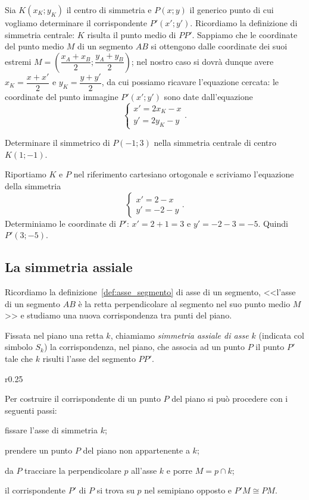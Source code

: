 Sia $K(x_K;y_K)$ il centro di simmetria e $P(x;y)$ il generico punto 
di cui vogliamo determinare il corrispondente $P'(x';y')$. Ricordiamo 
la definizione di simmetria centrale: $K$ risulta il punto medio di 
$PP'$. Sappiamo che le coordinate del punto medio $M$ di un segmento 
$AB$ si ottengono dalle coordinate dei suoi estremi 
$M=\left(\dfrac{x_A+x_B}{2};\dfrac{y_A+y_B}{2}\right)$; nel nostro 
caso si dovrà dunque avere $x_K=\dfrac{x+x'}{2}$ e 
$y_K=\dfrac{y+y'}{2}$, da cui possiamo ricavare l'equazione cercata: 
le coordinate del punto immagine $P'(x';y')$ sono date dall'equazione
\[\begin{cases}x'=2x_K-x\\y'=2y_K-y\end{cases}.\]
\pagebreak
\begin{exrig}
\begin{esempio}
Determinare il simmetrico di $P(-1;3)$ nella simmetria centrale di 
centro $K(1;-1)$.\vspace{7pt}

Riportiamo $K$ e $P$ nel riferimento cartesiano ortogonale e 
scriviamo l'equazione della simmetria
\[\begin{cases}x'=2-x\\y'=-2-y\end{cases}.\]
Determiniamo le coordinate di $P'$: $x'=2+1=3$ e $y'=-2-3=-5$. Quindi 
$P'(3;-5)$.
\end{esempio}
\end{exrig}

\subsection{La simmetria assiale}

Ricordiamo la definizione~\ref{def:asse_segmento} di asse di un 
segmento, <<l'asse di un segmento $AB$ è la retta perpendicolare al 
segmento nel suo punto medio $M$>> e studiamo una nuova 
corrispondenza tra punti del piano.

\begin{definizione}
Fissata nel piano una retta $k$, chiamiamo \emph{simmetria assiale di 
asse $k$} (indicata col simbolo $S_k$) la corrispondenza, nel piano, 
che associa ad un punto $P$ il punto $P'$ tale che $k$ risulti l'asse 
del segmento $PP'$.
\end{definizione}

\setlength{\intextsep}{3pt plus 2.0pt minus 2.0pt}
\begin{wrapfigure}{r}{0.25\textwidth}
	\centering
\end{wrapfigure}
Per costruire il corrispondente di un punto $P$ del piano si può 
procedere con i seguenti passi:
\begin{enumerate*}
\item fissare l'asse di simmetria $k$;
\item prendere un punto $P$ del piano non appartenente a $k$;
\item da $P$ tracciare la perpendicolare $p$ all'asse $k$ e porre 
$M=p\cap k$;
\item il corrispondente $P'$ di $P$ si trova su $p$ nel semipiano 
opposto e $P'M\cong PM$.
\end{enumerate*}

